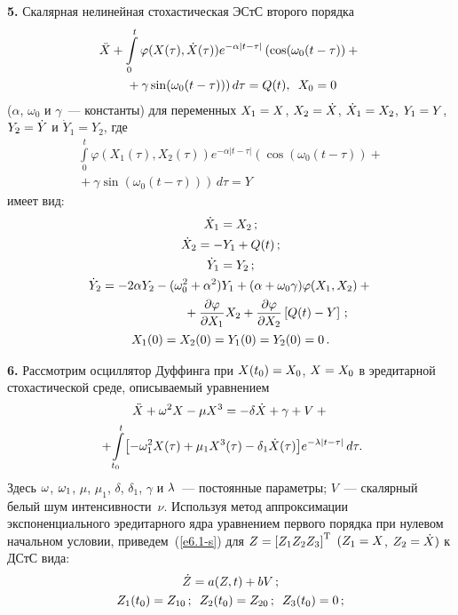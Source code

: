 \begin{multicols}{2}
{\bf 5.}
 Скалярная нелинейная стохастическая ЭСтС второго порядка
       \begin{multline*}
       \ddot{X}+\int\limits_{0}^{t}\varphi(X(\tau),\dot{X}(\tau))e^{-\alpha |t-\tau|}
        \left(
            \cos (\omega_0(t-\tau)) + {}\right.\\
            \left.{}+\gamma \sin (\omega_0(t-\tau))
        \right)
        d\tau = Q(t), \enskip  X_0 = 0
        \end{multline*}
($\alpha$, $\omega_0$ и $\gamma$~--- константы) для переменных
    $X_1 \hm= X$, $X_2\hm = \dot{X}$,  
$\dot{X}_1 \hm= X_2$, $Y_1\hm=Y$, $Y_2\hm=\dot{Y}$ и $\dot{Y}_1 = Y_2$,
где
    \begin{multline*}
    \int\limits_{0}^{t}\varphi(X_1(\tau),X_2(\tau))e^{-\alpha |t-\tau|}
        \left(
            \cos (\omega_0(t-\tau)) + {}\right.\\
            \left.{}+\gamma \sin (\omega_0(t-\tau))
        \right)\,         d\tau = Y
        \end{multline*}
 имеет вид:
\begin{gather*}
\dot{X}_1 = X_2\,; \\
\dot{X}_2 = -Y_1 + Q(t)\,; \\
\dot{Y}_1 = Y_2\,; \\
\dot{Y}_2 =  -2\alpha Y_2 - 
    (\omega_0^2 + \alpha^2)Y_1 +
    (\alpha + \omega_0 \gamma) \varphi(X_1,X_2) + {}\\
\hspace*{20mm} {}+
    \fr{\partial \varphi}{\partial X_1} X_2 +
 \fr{\partial \varphi}{\partial X_2} \left[Q(t)-Y\right]\,; \\
      X_1(0) = X_2(0) = Y_1(0) = Y_2(0) = 0\,. 
   \end{gather*}

{\bf 6.}
Рассмотрим осциллятор Дуффинга  при $X(t_0) \hm= X_0$, $X\hm=X_0$ в эредитарной 
стохастической среде, описываемый уравнением
  \begin{multline}
  \ddot X +\w^2 X -\mu X^3 =-\delta \dot X +\gamma +V +{}\\
\!\!\!\!{}+\!\iii_{t_0}^t\! \lk - \w_1^2 X(\tau) +\mu_1 X^3 (\tau) -\delta_1 \dot X(\tau) \rk \!
e^{-\la |t-\tau|}\, d\tau.\!\!\!\!\label{e6.1-s}
\end{multline}
Здесь $\omega$, $\omega_1$, $\mu$, $\mu_1$, $\delta$, $\delta_1$, $\gamma$ и $\lambda$~--- 
постоянные па\-ра\-мет\-ры; $V$~--- скалярный белый шум интенсивности~$\nu$. 
Используя метод аппроксимации экспоненциального эредитарного 
ядра уравнением первого порядка при нулевом начальном условии, приведем~(\ref{e6.1-s}) 
для $Z\hm= \lk Z_1 Z_2 Z_3\rk^{\mathrm{T}}$ $(Z_1\hm=X$, $Z_2\hm =\dot X)$ к ДСтС вида:
    \begin{gather}
    \dot Z = a (Z,t) + bV\,;\label{e6.2-s}\\
Z_1 (t_0) = Z_{10}\,; \enskip Z_2 (t_0) = Z_{20}\,; \enskip Z_3 (t_0) =0\,;\notag %
\end{gather}


\end{multicols}
